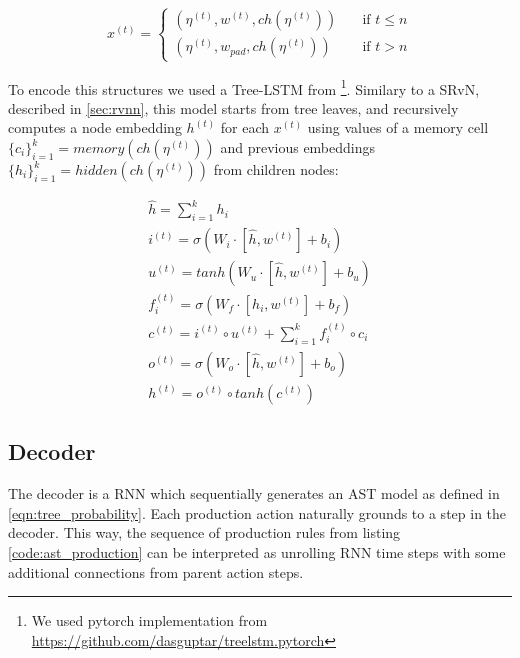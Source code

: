 \begin{equation}
 x^{(t)} =
  \begin{cases}
    (\eta^{(t)}, w^{(t)}, ch(\eta^{(t)}))  & \quad \text{if } t\leq n\\
    (\eta^{(t)}, w_{pad}, ch(\eta^{(t)}))  & \quad \text{if } t > n
  \end{cases}
\label{eq:enc_input}
\end{equation}

To encode this structures we used a Tree-LSTM from \cite{Tai2015}\footnote{We used pytorch implementation from \href{https://github.com/dasguptar/treelstm.pytorch}{https://github.com/dasguptar/treelstm.pytorch}}. Similary to a SRvN, described in \cref{sec:rvnn}, this model starts from tree leaves, and recursively computes a node embedding $h^{(t)}$ for each $x^{(t)}$ using values of a memory cell $\{c_i\}^{k}_{i=1} = memory(ch(\eta^{(t)}))$ and previous embeddings $\{h_i\}^{k}_{i=1} = hidden(ch(\eta^{(t)}))$ from children nodes:

\begin{equation}
\begin{gathered}
    \hat{h} = \sum^{k}_{i=1}h_i \\
    
    i^{(t)} = \sigma(W_i\cdot[\hat{h}, w^{(t)}]+b_i) \\
    
    u^{(t)} = tanh(W_u\cdot[\hat{h}, w^{(t)}]+b_u) \\
    
    f^{(t)}_i = \sigma(W_{f}\cdot [h_i, w^{(t)}] + b_f) \\
    
    c^{(t)} = i^{(t)} \circ u^{(t)} + \sum_{i=1}^{k} f^{(t)}_i \circ c_i \\
    
    o^{(t)} = \sigma(W_o\cdot[\hat{h}, w^{(t)}]+b_o) \\
    
    h^{(t)} = o^{(t)} \circ tanh(c^{(t)})

\end{gathered}
\label{eq:tree_lstm}
\end{equation}

\subsection{Decoder}
The decoder is a RNN which sequentially generates an AST model as defined in \cref{eqn:tree_probability}. Each production action naturally grounds to a step in the decoder. This way, the sequence of production rules from listing \ref{code:ast_production} can be interpreted as unrolling RNN time steps with some additional connections from parent action steps.


